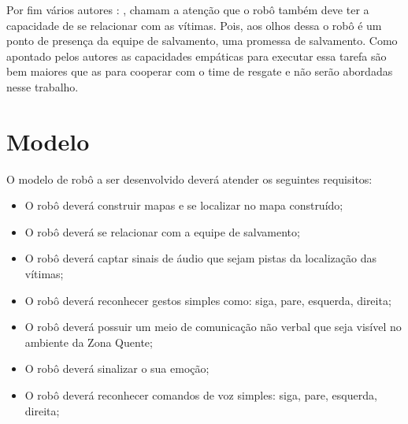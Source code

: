 \documentclass[
	article,			%
	11pt,				%
	oneside,			%
	a4paper,			%
	english,			%
	brazil,				%
	sumario=tradicional	
	]{abntex2}
\begin{document}

Por fim vários autores : \cite{Robin2004}, \cite{akgun2022using} chamam a atenção que o robô também deve ter a capacidade de se relacionar com as vítimas. Pois, aos olhos dessa o robô é um ponto de presença da equipe de salvamento, uma promessa de salvamento. Como apontado pelos autores as capacidades empáticas para executar essa tarefa são bem maiores que as para cooperar com o time de resgate e não serão abordadas nesse trabalho.


\section{Modelo}
O modelo de robô a ser desenvolvido deverá atender os seguintes requisitos:

\begin{itemize}
\item O robô deverá construir mapas e se localizar no mapa construído;
\item O robô deverá se relacionar com a equipe de salvamento;
\item O robô deverá captar sinais de áudio que sejam pistas da localização das vítimas;
\item O robô deverá reconhecer gestos simples como: siga, pare, esquerda, direita;
\item O robô deverá possuir um meio de comunicação não verbal que seja visível no ambiente da Zona Quente;
\item O robô deverá sinalizar o sua emoção;
\item O robô deverá reconhecer comandos de voz simples: siga, pare, esquerda, direita;
\end{itemize}
\end{document}
